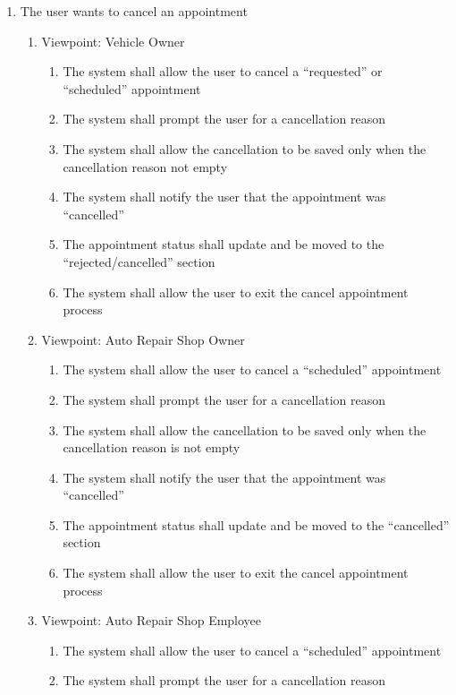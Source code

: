\documentclass[12pt]{article}
\begin{document}
\begin{enumerate}[resume*=business_events]
	\item The user wants to cancel an appointment
	      \begin{enumerate}[VP\arabic*.]
		      \item Viewpoint: Vehicle Owner
		            \begin{enumerate}
			            \item The system shall allow the user to cancel a ``requested'' or ``scheduled'' appointment
			            \item The system shall prompt the user for a cancellation reason
			            \item The system shall allow the cancellation to be saved only when the cancellation reason not empty
			            \item The system shall notify the user that the appointment was ``cancelled''
			            \item The appointment status shall update and be moved to the ``rejected/cancelled'' section
			            \item The system shall allow the user to exit the cancel appointment process
		            \end{enumerate}
		      \item Viewpoint: Auto Repair Shop Owner
		            \begin{enumerate}
			            \item The system shall allow the user to cancel a ``scheduled'' appointment
			            \item The system shall prompt the user for a cancellation reason
			            \item The system shall allow the cancellation to be saved only when the cancellation reason is not empty
			            \item The system shall notify the user that the appointment was ``cancelled''
			            \item The appointment status shall update and be moved to the ``cancelled'' section
			            \item The system shall allow the user to exit the cancel appointment process
		            \end{enumerate}
		      \item Viewpoint: Auto Repair Shop Employee
		            \begin{enumerate}
			            \item The system shall allow the user to cancel a ``scheduled'' appointment
			            \item The system shall prompt the user for a cancellation reason

\end{enumerate}
\end{enumerate}
\end{enumerate}
\end{document}
